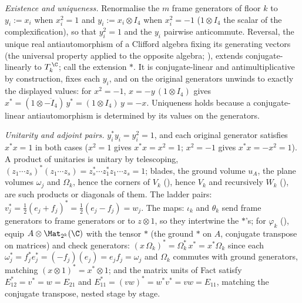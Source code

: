 \emph{Existence and uniqueness.} Renormalise the $m$ frame generators of floor $k$ to $y_i := x_i$ when $x_i^2 = 1$ and $y_i := x_i \otimes I_4$ when $x_i^2 = -1$ ($1 \otimes I_4$ the scalar of the complexification), so that $y_i^2 = 1$ and the $y_i$ pairwise anticommute. Reversal, the unique real antiautomorphism of a Clifford algebra fixing its generating vectors (the universal property applied to the opposite algebra; ), extends conjugate-linearly to $T_k^{\,\C}$; call the extension $*$. It is conjugate-linear and antimultiplicative by construction, fixes each $y_i$, and on the original generators unwinds to exactly the displayed values: for $x^2 = -1$, $x = -y\,(1 \otimes I_4)$ gives $x^* = (1 \otimes \overline{-I_4})\,y^* = (1 \otimes I_4)\,y = -x$. Uniqueness holds because a conjugate-linear antiautomorphism is determined by its values on the generators.

\emph{Unitarity and adjoint pairs.} $y_i^* y_i = y_i^2 = 1$, and each original generator satisfies $x^* x = 1$ in both cases ($x^2 = 1$ gives $x^*x = x^2 = 1$; $x^2 = -1$ gives $x^*x = -x^2 = 1$). A product of unitaries is unitary by telescoping, $(z_1 \cdots z_s)^* (z_1 \cdots z_s) = z_s^* \cdots z_1^* z_1 \cdots z_s = 1$; blades, the ground volume $u_A$, the plane volumes $\omega_j$ and $\Omega_k$, hence the corners of $V_k$ (), hence $V_k$ and recursively $W_k$ (), are such products or diagonals of them. The ladder pairs: $v_j^* = \tfrac12(e_j + f_j)^* = \tfrac12(e_j - f_j) = w_j$. The maps: $\iota_k$ and $\theta_k$ send frame generators to frame generators or to $z \otimes 1$, so they intertwine the $*$'s; for $\varphi_k$ (), equip $A \otimes \Mat_{2^k}(\C)$ with the tensor $*$ (the ground $*$ on $A$, conjugate transpose on matrices) and check generators: $(x\,\Omega_k)^* = \Omega_k^*\, x^* = x^* \Omega_k$ since each $\omega_j^* = f_j^* e_j^* = (-f_j)(e_j) = e_j f_j = \omega_j$ and $\Omega_k$ commutes with ground generators, matching $(x \otimes 1)^* = x^* \otimes 1$; and the matrix units of Fact  satisfy $E_{12}^* = v^* = w = E_{21}$ and $E_{11}^* = (vw)^* = w^* v^* = vw = E_{11}$, matching the conjugate transpose, nested stage by stage.


